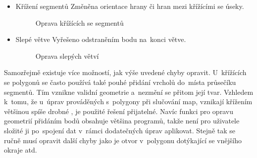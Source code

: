 \begin{itemize}
 \item Křížení segmentů
	\subitem Změněna orientace hrany či hran mezi křížícími se úseky.

  \begin{figure}[H]
    \centering
      \def\svgwidth{360pt}
      
      \caption{Oprava křížících se segmentů}
      \label{fig:crossing}
  \end{figure}

 \item Slepé větve
	\subitem Vyřešeno odstraněním bodu na~konci větve.

  \begin{figure}[H]
    \centering
      \def\svgwidth{360pt}
      
      \caption{Oprava slepých větví}
      \label{fig:dead-branch}
  \end{figure}

\end{itemize}

Samozřejmě existuje více možností, jak výše uvedené chyby opravit.
U~křížících se polygonů se často používá také pouhé přidání vrcholů
do~místa průsečíku segmentů. Tím vznikne validní geometrie a~nezmění
se přitom její tvar. Vzhledem k~tomu, že u~úprav prováděných 
s~polygony při slučování map, vznikají křížením většinou spíše drobné
, je použité řešení přijatelné. Navíc funkci pro opravu
geometrií přidáním bodů obsahuje většina  programů, takže není
pro uživatele složité ji po~spojení dat v~rámci dodatečných úprav
aplikovat. Stejně tak se ručně musí opravit další chyby jako je 
otvor v~polygonu dotýkající se vnějšího okraje atd.
